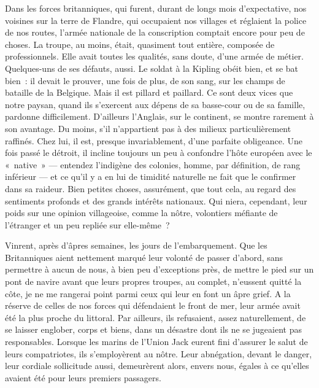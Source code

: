 \documentclass[french,twoside]{book} %
\begin{document}
Dans les forces britanniques, qui furent, durant de longs mois d’expectative, nos voisines sur la terre de Flandre, qui occupaient nos villages et réglaient la police de nos routes, l’armée nationale de la conscription comptait encore pour peu de choses. La troupe, au moins, était, quasiment tout entière, composée de professionnels. Elle avait toutes les qualités, sans doute, d’une armée de métier. Quelques-uns de ses défauts, aussi. Le soldat à la Kipling obéit bien, et se bat bien : il devait le prouver, une fois de plus, de son sang, sur les champs de bataille de la Belgique. Mais il est pillard et paillard. Ce sont deux vices que notre paysan, quand ils s’exercent aux dépens de sa basse-cour ou de sa famille, pardonne difficilement. D’ailleurs l’Anglais, sur le continent, se montre rarement à son avantage. Du moins, s’il n’appartient pas à des milieux particulièrement raffinés. Chez lui, il est, presque invariablement, d’une parfaite obligeance. Une fois passé le détroit, il incline toujours un peu à confondre l’hôte européen avec le « native » — entendez l’indigène des colonies, homme, par définition, de rang inférieur — et ce qu’il y a en lui de timidité naturelle ne fait que le confirmer dans sa raideur. Bien petites   choses, assurément, que tout cela, au regard des sentiments profonds et des grands intérêts nationaux. Qui niera, cependant, leur poids sur une opinion villageoise, comme la nôtre, volontiers méfiante de l’étranger et un peu repliée sur elle-même ?\par
Vinrent, après d’âpres semaines, les jours de l’embarquement. Que les Britanniques aient nettement marqué leur volonté de passer d’abord, sans permettre à aucun de nous, à bien peu d’exceptions près, de mettre le pied sur un pont de navire avant que leurs propres troupes, au complet, n’eussent quitté la côte, je ne me rangerai point parmi ceux qui leur en font un âpre grief. A la réserve de celles de nos forces qui défendaient le front de mer, leur armée avait été la plus proche du littoral. Par ailleurs, ils refusaient, assez naturellement, de se laisser englober, corps et biens, dans un désastre dont ils ne se jugeaient pas responsables. Lorsque les marins de l’Union Jack eurent fini d’assurer le salut de leurs compatriotes, ils s’employèrent au nôtre. Leur abnégation, devant le danger, leur cordiale sollicitude aussi, demeurèrent alors, envers nous, égales à ce qu’elles avaient été pour leurs premiers passagers.\par
\end{document}
